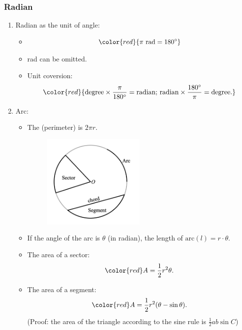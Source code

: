 \documentclass[12pt, a4paper]{article}
\begin{document}
\subsubsection{Radian}
\begin{enumerate}
  \item Radian as the unit of angle: 
  \begin{itemize}
    \item $${\color{red}{\pi\ \text{rad}=180^\circ}}$$
    \item rad can be omitted. {}
    \item Unit coversion: $${\color{red}{\text{degree}\times\frac{\pi}{180^\circ}=\text{radian;\ radian}\times\frac{180^\circ}{\pi}=\text{degree}.}}$$
  \end{itemize}
  \item Arc: 
  \begin{itemize}
    \item The \textbf{\color{red}{circumference}} (perimeter) is $2\pi r$.
    \begin{figure}[H]
      \centering
      \includegraphics[width=0.5\textwidth]{Fig.3.18.jpg}
    \end{figure}
    \item If the angle of the arc is $\theta$ (in radian), the length of $\text{arc}(l)=r\cdot\theta$.
    \item The area of a sector: $$\color{red}A=\frac{1}{2}r^2\theta.$$
    \item The area of a segment: $$\color{red}A=\frac{1}{2}r^2(\theta-\sin\theta).$$(Proof: the area of the triangle according to the sine rule is $\frac{1}{2}ab\sin C$)
  \end{itemize}
\end{enumerate}
\end{document}
